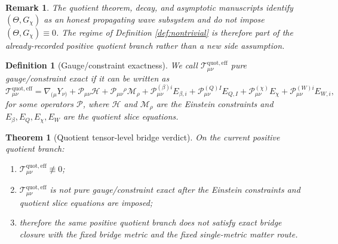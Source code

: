 \documentclass[11pt]{article}
\newcommand{\EffAux}{\mathcal T_{\mu\nu}^{\mathrm{quot,eff}}}
\newtheorem{definition}{Definition}
\newtheorem{remark}{Remark}
\newtheorem{theorem}{Theorem}
\begin{document}
\begin{remark}
The quotient theorem, decay, and asymptotic manuscripts identify \((\Theta,G_\chi)\) as an honest propagating wave subsystem and do not impose \((\Theta,G_\chi)\equiv0\). The regime of Definition \ref{def:nontrivial} is therefore part of the already-recorded positive quotient branch rather than a new side assumption.
\end{remark}

\begin{definition}[Gauge/constraint exactness]
\label{def:pure}
We call \(\EffAux\) \emph{pure gauge/constraint exact} if it can be written as
\begin{equation}
\EffAux
=
\nabla_{(\mu}Y_{\nu)}
+\mathcal P_{\mu\nu}\mathcal H
+\mathcal P_{\mu\nu}{}^\rho\mathcal M_\rho
+\mathcal P_{\mu\nu}^{(\beta)i}E_{\beta,i}
+\mathcal P_{\mu\nu}^{(Q)I}E_{Q,I}
+\mathcal P_{\mu\nu}^{(\chi)}E_\chi
+\mathcal P_{\mu\nu}^{(W)i}E_{W,i},
\label{eq:pure}
\end{equation}
for some operators \(\mathcal P\), where \(\mathcal H\) and \(\mathcal M_\rho\) are the Einstein constraints and \(E_\beta,E_Q,E_\chi,E_W\) are the quotient slice equations.
\end{definition}

\begin{theorem}[Quotient tensor-level bridge verdict]
\label{thm:verdict}
On the current positive quotient branch:
\begin{enumerate}
    \item \(\EffAux\not\equiv0\);
    \item \(\EffAux\) is not pure gauge/constraint exact after the Einstein constraints and quotient slice equations are imposed;
    \item therefore the same positive quotient branch does \emph{not} satisfy exact bridge closure with the fixed bridge metric and the fixed single-metric matter route.
\end{enumerate}
\end{theorem}
\end{document}

